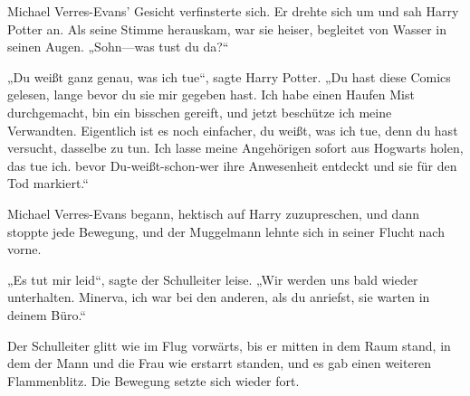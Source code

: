 Michael Verres-Evans' Gesicht verfinsterte sich. Er drehte sich um und sah Harry Potter an. Als seine Stimme herauskam, war sie heiser, begleitet von Wasser in seinen Augen. „Sohn—was tust du da?“

„Du weißt ganz genau, was ich tue“, sagte Harry Potter. „Du hast diese Comics gelesen, lange bevor du sie mir gegeben hast. Ich habe einen Haufen Mist durchgemacht, bin ein bisschen gereift, und jetzt beschütze ich meine Verwandten. Eigentlich ist es noch einfacher, du weißt, was ich tue, denn du hast versucht, dasselbe zu tun. Ich lasse meine Angehörigen sofort aus Hogwarts holen, das tue ich. bevor Du-weißt-schon-wer ihre Anwesenheit entdeckt und sie für den Tod markiert.“

Michael Verres-Evans begann, hektisch auf Harry zuzupreschen, und dann stoppte jede Bewegung, und der Muggelmann lehnte sich in seiner Flucht nach vorne.

„Es tut mir leid“, sagte der Schulleiter leise. „Wir werden uns bald wieder unterhalten. Minerva, ich war bei den anderen, als du anriefst, sie warten in deinem Büro.“


Der Schulleiter glitt wie im Flug vorwärts, bis er mitten in dem Raum stand, in dem der Mann und die Frau wie erstarrt standen, und es gab einen weiteren Flammenblitz. Die Bewegung setzte sich wieder fort.

